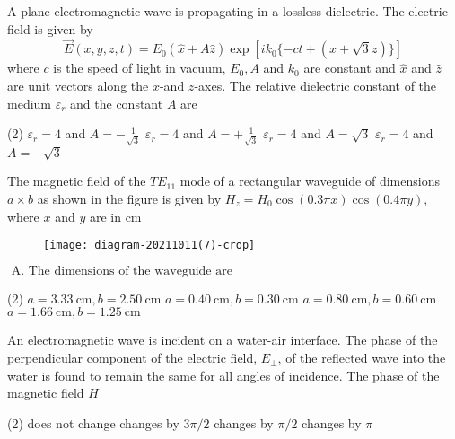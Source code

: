 \begin{enumerate}
\begin{minipage}{\textwidth}
	\item A plane electromagnetic wave is propagating in a lossless dielectric. The electric field is given by
	$$
	\vec{E}(x, y, z, t)=E_{0}(\hat{x}+A \hat{z}) \exp \left[i k_{0}\{-c t+(x+\sqrt{3} z)\}\right]
	$$
	where $c$ is the speed of light in vacuum, $E_{0}, A$ and $k_{0}$ are constant and $\hat{x}$ and $\hat{z}$ are unit vectors along the $x$-and $z$-axes. The relative dielectric constant of the medium $\varepsilon_{r}$ and the constant $A$ are
\end{minipage}
\begin{tasks}(2)
	\task[\textbf{A.}]$\varepsilon_{r}=4$ and $A=-\frac{1}{\sqrt{3}}$
	\task[\textbf{B.}]$\varepsilon_{r}=4$ and $A=+\frac{1}{\sqrt{3}}$
	\task[\textbf{C.}]$\varepsilon_{r}=4$ and $A=\sqrt{3}$
	\task[\textbf{D.}]$\varepsilon_{r}=4$ and $A=-\sqrt{3}$
\end{tasks}
\begin{minipage}{\textwidth}
	\item The magnetic field of the $T E_{11}$ mode of a rectangular waveguide of dimensions $a \times b$ as shown in the figure is given by $H_{z}=H_{0} \cos (0.3 \pi x) \cos (0.4 \pi y)$, where $x$ and $y$ are in cm
	\begin{figure}[H]
		\centering
		\texttt{[image: diagram-20211011(7)-crop]}
	\end{figure}
\end{minipage}
$\text { A. The dimensions of the waveguide are }$
\begin{tasks}(2)
	\task[\textbf{A.}] $a=3.33 \mathrm{~cm}, b=2.50 \mathrm{~cm}$
	\task[\textbf{B.}]$a=0.40 \mathrm{~cm}, b=0.30 \mathrm{~cm}$
	\task[\textbf{C.}]$a=0.80 \mathrm{~cm}, b=0.60 \mathrm{~cm}$
	\task[\textbf{D.}] $a=1.66 \mathrm{~cm}, b=1.25 \mathrm{~cm}$
\end{tasks}

\begin{minipage}{\textwidth}
	\item An electromagnetic wave is incident on a water-air interface. The phase of the perpendicular component of the electric field, $E_{\perp}$, of the reflected wave into the water is found to remain the same for all angles of incidence. The phase of the magnetic field $H$
\end{minipage}
\begin{tasks}(2)
	\task[\textbf{A.}]does not change
	\task[\textbf{B.}]changes by $3 \pi / 2$
	\task[\textbf{C.}]changes by $\pi / 2$
	\task[\textbf{D.}]changes by $\pi$
\end{tasks}


\end{enumerate}
